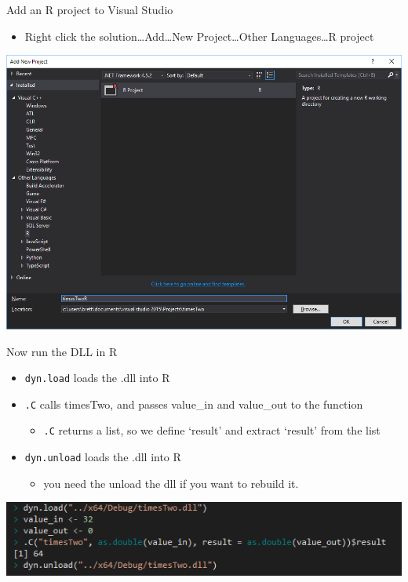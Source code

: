 \documentclass[ignorenonframetext,]{beamer}
\providecommand{\tightlist}{%
\setlength{\itemsep}{0pt}\setlength{\parskip}{0pt}}
\begin{document}
\begin{frame}{Add an R project to Visual Studio}

\begin{itemize}
\tightlist
\item
  Right click the solution\ldots{}Add\ldots{}New Project\ldots{}Other
  Languages\ldots{}R project
\end{itemize}

\centerline{
  \includegraphics[width=\textwidth,height=0.7\textheight,keepaspectratio]{./timesTwoR.PNG}
}

\end{frame}

\begin{frame}[fragile]{Now run the DLL in R}

\begin{itemize}
\tightlist
\item
  \texttt{dyn.load} loads the .dll into R
\item
  \texttt{.C} calls timesTwo, and passes value\_in and value\_out to the
  function

  \begin{itemize}
  \tightlist
  \item
    \texttt{.C} returns a list, so we define `result' and extract
    `result' from the list
  \end{itemize}
\item
  \texttt{dyn.unload} loads the .dll into R

  \begin{itemize}
  \tightlist
  \item
    you need the unload the dll if you want to rebuild it.
  \end{itemize}
\end{itemize}

\centerline{
  \includegraphics[width=\textwidth,height=0.8\textheight,keepaspectratio]{./DLLinR.PNG}
}

\end{frame}
\end{document}
